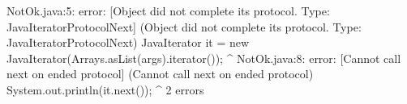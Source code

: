 \lstset{caption=New Mungo output}
\begin{code}
NotOk.java:5: error: [Object did not complete its protocol. Type: JavaIteratorProtocol{Next}] (Object did not complete its protocol. Type: JavaIteratorProtocol{Next})
    JavaIterator it = new JavaIterator(Arrays.asList(args).iterator());
                 ^
NotOk.java:8: error: [Cannot call next on ended protocol] (Cannot call next on ended protocol)
      System.out.println(it.next());
                                ^
2 errors
\end{code}

